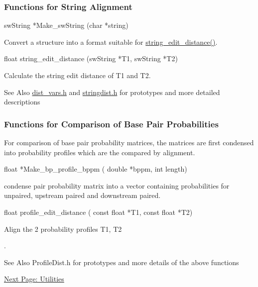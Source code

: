 \subsubsection*{Functions for String Alignment}

\begin{DoxyVerb}swString *Make_swString (char *string)
\end{DoxyVerb}
 Convert a structure into a format suitable for \hyperlink{stringdist_8h_a89e3c335ef17780576d7c0e713830db9}{string\-\_\-edit\-\_\-distance()}.

\begin{DoxyVerb}float     string_edit_distance (swString *T1,
                                swString *T2)
\end{DoxyVerb}
 Calculate the string edit distance of T1 and T2.

\begin{DoxySeeAlso}{See Also}
\hyperlink{dist__vars_8h}{dist\-\_\-vars.\-h} and \hyperlink{stringdist_8h}{stringdist.\-h} for prototypes and more detailed descriptions
\end{DoxySeeAlso}
\subsubsection*{Functions for Comparison of Base Pair Probabilities}

For comparison of base pair probability matrices, the matrices are first condensed into probability profiles which are the compared by alignment.

\begin{DoxyVerb}float *Make_bp_profile_bppm ( double *bppm,
                              int length)
\end{DoxyVerb}
 condense pair probability matrix into a vector containing probabilities for unpaired, upstream paired and downstream paired.

\begin{DoxyVerb}float profile_edit_distance ( const float *T1,
                              const float *T2)
\end{DoxyVerb}
 Align the 2 probability profiles T1, T2\par
.

\begin{DoxySeeAlso}{See Also}
Profile\-Dist.\-h for prototypes and more details of the above functions
\end{DoxySeeAlso}
\hyperlink{mp_utils}{Next Page\-: Utilities} 